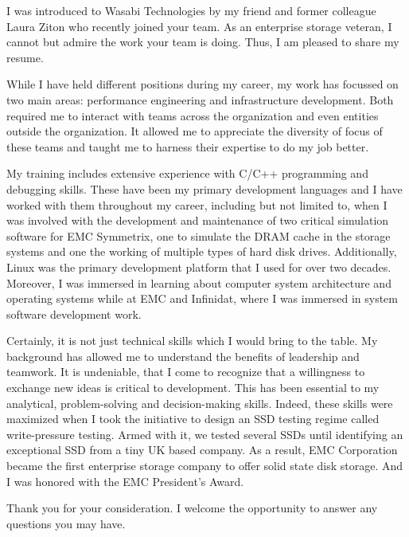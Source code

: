 \documentclass[busletter,dateno]{newlfm}
\begin{document}
I was introduced to Wasabi Technologies by my friend and former colleague 
Laura Ziton who recently joined your team. As an enterprise storage veteran,
I cannot but admire the work your team is doing. Thus, I am pleased to share my resume.

While I have held different positions during my career, my work has focussed on two main areas:
performance engineering and infrastructure development. Both required me to interact with
teams across the organization and even entities outside the organization. It allowed me to
appreciate the diversity of focus of these teams and taught me to harness their
expertise to do my job better.

My training includes extensive experience
with C/C++ programming and debugging skills. These have been my primary
development languages and I have worked with them throughout my career,
including but not limited to, when I was involved with the development and
maintenance of two critical simulation software for EMC Symmetrix, one to
simulate the DRAM cache in the storage systems and one the working of multiple
types of hard disk drives. Additionally, Linux was the primary development
platform that I used for over two decades. Moreover, I was immersed in
learning about computer system architecture and operating systems while at EMC
and Infinidat, where I was immersed in system software development work. 

Certainly, it is not just technical skills which I would bring to the table.
My background has allowed me to understand the benefits of leadership and
teamwork. It is undeniable, that I come to recognize that a willingness to
exchange new ideas is critical to development. This has been essential to my
analytical, problem-solving and decision-making skills. Indeed, these skills
were maximized when I took the initiative to design an SSD testing regime
called write-pressure testing. Armed with it, we tested several SSDs until
identifying an exceptional SSD from a tiny UK based company. As a result,
EMC Corporation became the first enterprise storage company to offer solid 
state disk storage. And I was honored with the EMC President's Award.

Thank you for your consideration.  I welcome the opportunity to answer any
questions you may have. 
\end{document}
